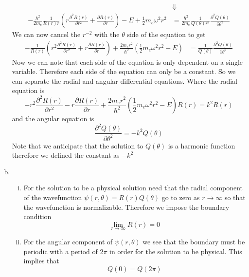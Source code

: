\documentclass[11pt]{article}
\numberwithin{equation}{section}
\begin{document}
\begin{enumerate}[(a)]
\begin{align*}
&\Downarrow\\
-\frac{\hbar^2}{2m_e}\frac{1}{R(r)r}\left(r\frac{\partial^2 R(r)}{\partial r^2} + \frac{\partial R(r)}{\partial r}\right) - E + \frac{1}{2}m_e\omega^2r^2 &= \frac{\hbar^2}{2m_e}\frac{1}{Q(\theta)r^2}\frac{\partial^2 Q(\theta)}{\partial\theta^2}
\end{align*}
We can now cancel the $r^{-2}$ with the $\theta$ side of the equation to get
\begin{align*}
-\frac{1}{R(r)}\left(r^2\frac{\partial^2 R(r)}{\partial r^2} + r\frac{\partial R(r)}{\partial r}\right) + \frac{2m_er^2}{\hbar^2}\left(\frac{1}{2}m_e\omega^2r^2 - E\right) &= \frac{1}{Q(\theta)}\frac{\partial^2 Q(\theta)}{\partial\theta^2}
\end{align*}
Now we can note that each side of the equation is only dependent on a single variable. Therefore each side of the equation can only be a constant. So we can separate the radial and angular differential equations. Where the radial equation is
\begin{equation}
-r^2\frac{\partial^2 R(r)}{\partial r^2} - r\frac{\partial R(r)}{\partial r} + \frac{2m_er^2}{\hbar^2}\left(\frac{1}{2}m_e\omega^2r^2 - E\right)R(r) = k^2R(r)
\label{RadDiffEq}
\end{equation}
and the angular equation is
\begin{equation}
\frac{\partial^2 Q(\theta)}{\partial\theta^2} = -k^2Q(\theta)
\label{AngDiffEq}
\end{equation}
Note that we anticipate that the solution to $Q(\theta)$ is a harmonic function therefore we defined the constant as $-k^2$

\item
\begin{enumerate}[(i)]
\item
For the solution to be a physical solution need that the radial component of the wavefunction $\psi(r,\theta) = R(r)Q(\theta)$ go to zero as $r\rightarrow\infty$ so that the wavefunction is normalizable. Therefore we impose the boundary condition
$$\lim_{r\rightarrow\infty} R(r) = 0$$

\item
For the angular component of $\psi(r,\theta)$ we see that the boundary must be periodic with a period of $2\pi$ in order for the solution to be physical. This implies that
$$Q(0) = Q(2\pi)$$
\end{enumerate}


\end{enumerate}
\end{document}
